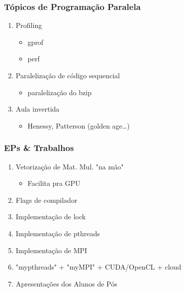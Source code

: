\documentclass[a4paper]{article}
\begin{document}
\subsubsection{Tópicos de Programação Paralela}
\label{sec:org540915d}
\begin{enumerate}
\item Profiling
\begin{itemize}
\item gprof
\item perf
\end{itemize}
\item Paralelização de código sequencial
\begin{itemize}
\item paralelização do bzip
\end{itemize}
\item Aula invertida
\begin{itemize}
\item Henessy, Patterson (golden age\ldots{})
\end{itemize}
\end{enumerate}
\subsubsection{EPs \& Trabalhos}
\label{sec:org319c9e7}
\begin{enumerate}
\item Vetorização de Mat. Mul. "na mão"
\begin{itemize}
\item Facilita pra GPU
\end{itemize}
\item Flags de compilador
\item Implementação de lock
\item Implementação de pthreads
\item Implementação de MPI
\item "mypthreads" + "myMPI" + CUDA/OpenCL + cloud
\item Apresentações dos Alunos de Pós
\end{enumerate}
\end{document}
